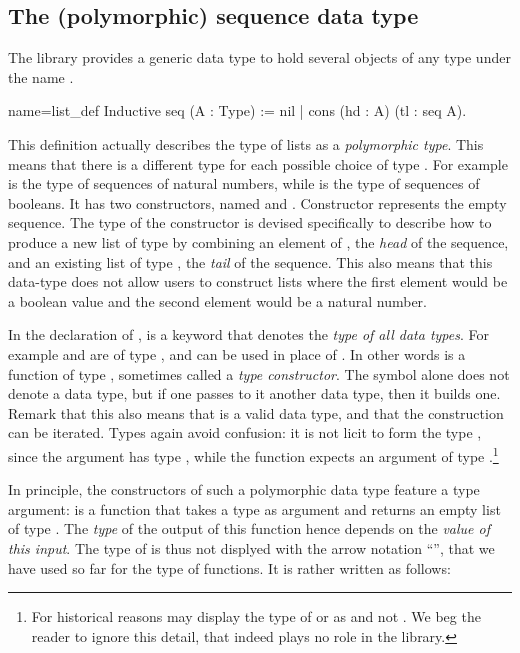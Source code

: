 \subsection{The (polymorphic) sequence data type}

The \mcbMC{} library provides a generic data type to hold
several objects of any type under the name .

\begin{coq}{name=list_def}{}
Inductive seq (A : Type) := nil | cons (hd : A) (tl : seq A).
\end{coq}
This definition actually describes the type of lists as a {\em
  polymorphic type}.  This means that there is a different type
 for each possible choice of type .  For example
 is the type of sequences of natural numbers, while
 is the type of sequences of booleans. It has two
constructors, named  and . Constructor 
represents the empty sequence. The type of the
constructor  is devised specifically to describe how to produce a
new list of type  by combining an element of , the
\emph{head} of the sequence, and an
existing list of type , the \emph{tail} of the sequence.  This
also means that this data-type
does not allow users to construct lists where the first element would be
a boolean value and the second element would be a natural number.

In the declaration of ,  is a keyword that denotes the
\emph{type of all data types}.  For example  and  are of type
, and can be used in place of .
In other words  is a function of type , sometimes
called a \emph{type constructor}.  The symbol  alone does not
denote a data type,
but if one passes to it another data type, then it builds one.  Remark
that this also means that  is a valid data type, and
that the construction can be iterated.
Types again avoid confusion: it is not licit to form the type ,
since the argument  has type , while the function
 expects an argument of type .\footnote{For historical
reasons \Coq{} may display the type of  or  as 
and not .  We beg the reader to ignore this detail, that indeed
plays no role in the \mcbMC{} library.}

In principle, the constructors of such a polymorphic data type feature
a type argument:
 is a function that takes a type  as argument and returns
an empty list of type . The \emph{type} of the output of
this function hence depends on the \emph{value of this input}. The
type of  is thus not displyed with the arrow notation
``'', that we have used so far for the type of
functions. It is rather written as follows:


